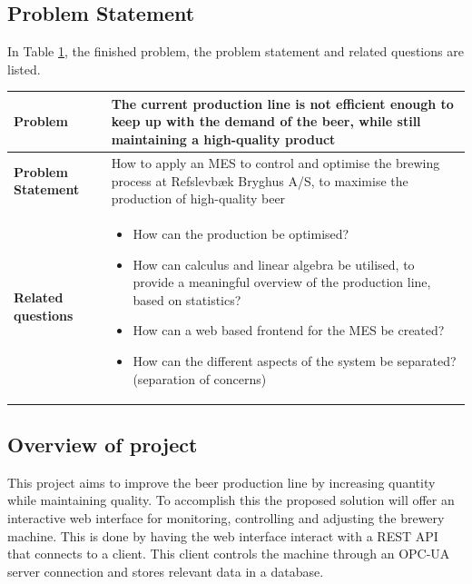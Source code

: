 \subsection{Problem Statement}
In Table \ref{table:problem-statement-report}, the finished problem, the problem statement and related questions are listed.
\begin{table}[ht]
    \begin{tabularx}{\textwidth}{|>{\RaggedRight}p{4cm}|>{\RaggedRight}X|}
        \hline
        \textbf{Problem} & The current production line is not efficient enough to keep up with the demand of the beer, while still maintaining a high-quality product\\
        \hline
        \textbf{Problem Statement} & How to apply an MES to control and optimise the brewing process at Refslevbæk Bryghus A/S, to maximise the production of high-quality beer\\
        \hline
        \textbf{Related questions} & 
            \begin{itemize}
                \item How can the production be optimised?
                \item How can calculus and linear algebra be utilised, to provide a meaningful overview of the production line, based on statistics?
                \item How can a web based frontend for the MES be created?
                \item How can the different aspects of the system be separated? (separation of concerns)
            \end{itemize} \\
            \hline
    \end{tabularx}
    \label{table:problem-statement-report}
\end{table} 

\subsection{Overview of project}
This project aims to improve the beer production line by increasing quantity
while maintaining quality. To accomplish this the proposed solution will offer
an interactive web interface for monitoring, controlling and adjusting the
brewery machine. This is done by having the web interface interact with a REST
API that connects to a client. This client controls the machine through an
OPC-UA server connection and stores relevant data in a database.

